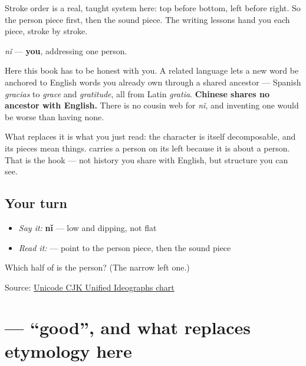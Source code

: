 Stroke order is a real, taught system here: top before bottom, left before right. So the person piece first, then the sound piece. The writing lessons hand you each piece, stroke by stroke.

\begin{cousinweb}
\textbf{} \emph{nǐ} — \textbf{you}, addressing one person.

Here this book has to be honest with you. A related language lets a new word be anchored to English words you already own through a shared ancestor — Spanish \emph{gracias} to \emph{grace} and \emph{gratitude}, all from Latin \emph{gratia}. \textbf{Chinese shares no ancestor with English.} There is no cousin web for \emph{nǐ}, and inventing one would be worse than having none.

What replaces it is what you just read: the character is itself decomposable, and its pieces mean things. \textbf{} carries a person on its left because it is about a person. That is the hook — not history you share with English, but structure you can see.
\end{cousinweb}

\subsection*{Your turn}
\begin{itemize}
\raggedright
  \item \emph{Say it:} \textbf{nǐ} — low and dipping, not flat
  \item \emph{Read it:} \textbf{} — point to the person piece, then the sound piece
\end{itemize}

\begin{tcolorbox}[breakable,colback=teal!4,colframe=teal!35!black,title={Before you move on}]
Which half of \textbf{} is the person? (The narrow left one.)

Source: \href{https://www.unicode.org/charts/PDF/U4E00.pdf}{Unicode CJK Unified Ideographs chart}
\end{tcolorbox}
\section[\texorpdfstring{\zh{好} (hǎo)}{好 (hǎo)}]{ — \textquotedblleft{}good\textquotedblright{}, and what replaces etymology here}

\label{lesson:ZH-C01-hao}



